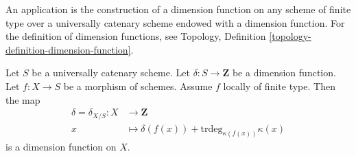 \noindent
An application is the construction of a dimension function
on any scheme of finite type over a universally catenary
scheme endowed with a dimension function. For the definition
of dimension functions, see
Topology, Definition \ref{topology-definition-dimension-function}.

\begin{lemma}
\label{lemma-dimension-function-propagates}
Let $S$ be a universally catenary scheme.
Let $\delta : S \to \mathbf{Z}$ be a dimension function.
Let $f : X \to S$ be a morphism of schemes.
Assume $f$ locally of finite type.
Then the map
\begin{align*}
\delta = \delta_{X/S} : X & \longrightarrow \mathbf{Z} \\
x & \longmapsto \delta(f(x)) + \text{trdeg}_{\kappa(f(x))} \kappa(x)
\end{align*}
is a dimension function on $X$.
\end{lemma}

